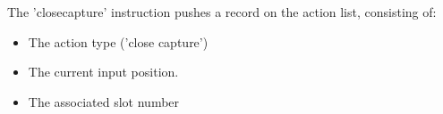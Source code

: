 The 'closecapture' instruction pushes a record on the action list,
consisting of:

\begin{itemize}
\item The action type ('close capture')
\item The current input position.
\item The associated slot number
\end{itemize}
